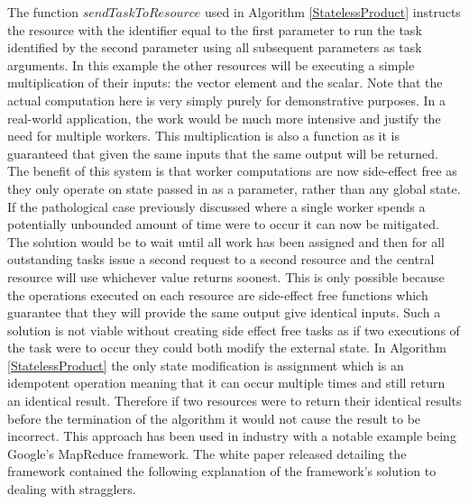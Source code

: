 \documentclass[12pt]{article}
\begin{document}
The function $sendTaskToResource$ used in Algorithm \ref{StatelessProduct} instructs the resource with the identifier equal to the first parameter to run the task identified by the second parameter using all subsequent parameters as task arguments.
\newline
\newline
In this example the other resources will be executing a simple multiplication of their inputs: the vector element and the scalar. Note that the actual computation here is very simply purely for demonstrative purposes. In a real-world application, the work would be much more intensive and justify the need for multiple workers. This multiplication is also a function as it is guaranteed that given the same inputs that the same output will be returned.
\newline
\newline
The benefit of this system is that worker computations are now side-effect free as they only operate on state passed in as a parameter, rather than any global state. If the pathological case previously discussed where a single worker spends a potentially unbounded amount of time were to occur it can now be mitigated. The solution would be to wait until all work has been assigned and then for all outstanding tasks issue a second request to a second resource and the central resource will use whichever value returns soonest. This is only possible because the operations executed on each resource are side-effect free functions which guarantee that they will provide the same output give identical inputs.
\newline
\newline
Such a solution is not viable without creating side effect free tasks as if two executions of the task were to occur they could both modify the external state.
\newline
\newline
In Algorithm \ref{StatelessProduct} the only state modification is assignment which is an idempotent operation meaning that it can occur multiple times and still return an identical result. Therefore if two resources were to return their identical results before the termination of the algorithm it would not cause the result to be incorrect.
\newline
\newline
This approach has been used in industry with a notable example being Google's MapReduce framework. The white paper released detailing the framework \cite{dean2008mapreduce} contained the following explanation of the framework's solution to dealing with stragglers.
\end{document}
